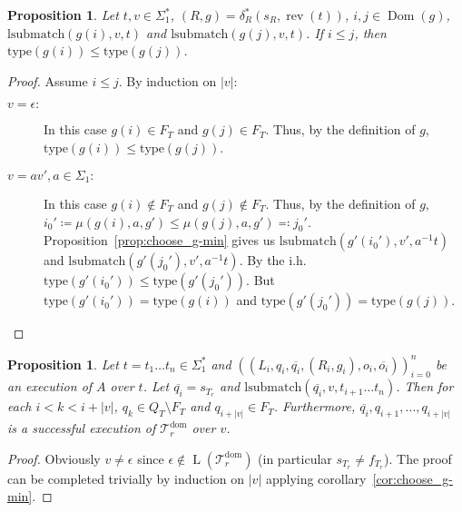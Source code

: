 \documentclass{article}
\newtheorem{proposition}[definition]{Proposition}
\newcommand{\len}[1]{\ensuremath{\left| #1 \right|}}
\DeclareMathOperator{\Dom}{Dom}
\DeclareMathOperator{\Lang}{L}
\DeclareMathOperator{\rev}{rev}
\begin{document}
	\begin{proposition} \label{prop:g-ordering_rule}
		Let $t, v \in \Sigma_1^*$, $(R, g) = \delta_R^*(s_R, \rev(t))$, $i, j\in \Dom(g)$, $\mathrm{lsubmatch}(g(i), v, t)$ and $\mathrm{lsubmatch}(g(j), v, t)$. If $i\le j$, then $\mathrm{type}(g(i))\le \mathrm{type}(g(j))$.
	\end{proposition}
	\begin{proof}
		Assume $i\le j$. By induction on \len{v}:
		\begin{description}
			\item[$v=\epsilon:$]
				In this case $g(i)\in F_T$ and $g(j)\in F_T$. Thus, by the definition of $g$, $\mathrm{type}(g(i))\le \mathrm{type}(g(j))$.
			\item[$v=av', a\in \Sigma_1:$]
				In this case $g(i)\notin F_T$ and $g(j)\notin F_T$. Thus, by the definition of $g$, $i_0'\coloneq\mu(g(i), a, g')\le \mu(g(j), a, g')\eqcolon j_0'$.
				Proposition~\ref{prop:choose_g-min} gives us $\mathrm{lsubmatch}(g'(i_0'), v', a^{-1}t)$ and $\mathrm{lsubmatch}(g'(j_0'), v', a^{-1}t)$. By the i.h. $\mathrm{type}(g'(i_0'))\le \mathrm{type}(g'(j_0'))$.
				But $\mathrm{type}(g'(i_0')) = \mathrm{type}(g(i))$ and $\mathrm{type}(g'(j_0')) = \mathrm{type}(g(j))$.
		\end{description}
	\end{proof}

	\begin{proposition} \label{prop:longest_match}
		Let $t=t_1\ldots t_n\in \Sigma_1^*$ and $((L_i, q_i, \overline{q_i}, (R_i, g_i), o_i, \overline{o_i}))_{i=0}^n$ be an execution of $A$ over $t$. Let $\overline{q_i} = s_{T_r}$ and $\mathrm{lsubmatch}(\overline{q_i}, v, t_{i+1}\ldots t_n)$. Then for each $i < k < i+\len{v}$, $q_k\in Q_T\setminus F_T$ and $q_{i+\len{v}}\in F_T$. Furthermore, $\overline{q_i}, q_{i+1}, \ldots, q_{i+\len{v}}$ is a successful execution of $\mathcal{T}_r^\mathrm{dom}$ over $v$.
	\end{proposition}
	\begin{proof}
		Obviously $v\ne \epsilon$ since $\epsilon\notin \Lang(\mathcal{T}_r^\mathrm{dom})$ (in particular $s_{T_r}\ne f_{T_r}$). The proof can be completed trivially by induction on \len{v} applying corollary~\ref{cor:choose_g-min}.
	\end{proof}
\end{document}
